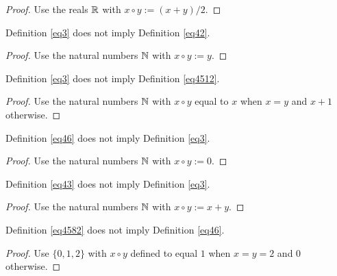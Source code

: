 \begin{proof}\leanok Use the reals $\mathbb{R}$ with $x \circ y := (x+y)/2$.
\end{proof}

\begin{theorem}\label{3_not_imply_42}\leanok{} Definition \ref{eq3} does not imply Definition \ref{eq42}.
\end{theorem}

\begin{proof}\leanok Use the natural numbers $\mathbb{N}$ with $x \circ y := y$.
\end{proof}

\begin{theorem}\label{3_not_imply_4512}\leanok{} Definition \ref{eq3} does not imply Definition \ref{eq4512}.
\end{theorem}

\begin{proof}\leanok Use the natural numbers $\mathbb{N}$ with $x \circ y$ equal to $x$ when $x=y$ and $x+1$ otherwise.
\end{proof}

\begin{theorem}\label{46_not_imply_3}\leanok{} Definition \ref{eq46} does not imply Definition \ref{eq3}.
\end{theorem}

\begin{proof}\leanok Use the natural numbers $\mathbb{N}$ with $x \circ y := 0$.
\end{proof}

\begin{theorem}\label{43_not_imply_3}\leanok{} Definition \ref{eq43} does not imply Definition \ref{eq3}.
\end{theorem}

\begin{proof}\leanok Use the natural numbers $\mathbb{N}$ with $x \circ y := x+y$.
\end{proof}

\begin{theorem}\label{4582_not_imply_46}\leanok{} Definition \ref{eq4582} does not imply Definition \ref{eq46}.
\end{theorem}

\begin{proof}\leanok Use $\{0,1,2\}$ with $x \circ y$ defined to equal $1$ when $x=y=2$ and $0$ otherwise.
\end{proof}
